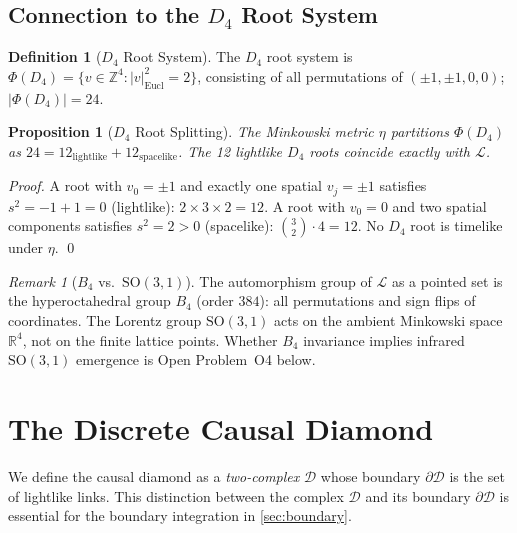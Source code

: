 \documentclass[12pt, a4paper]{article}
\theoremstyle{plain}
\newtheorem{proposition}[theorem]{Proposition}
\theoremstyle{definition}
\newtheorem{definition}[theorem]{Definition}
\theoremstyle{remark}
\newtheorem{remark}[theorem]{Remark}
\newcommand{\Lat}{\mathscr{L}}
\newcommand{\CD}{\mathscr{D}}
\newcommand{\BdyCD}{\partial\mathscr{D}}
\newcommand{\LL}{\mathcal{L}}
\newcommand{\ssp}{s^2}
\newcommand{\R}{\mathbb{R}}
\newcommand{\Z}{\mathbb{Z}}
\begin{document}
\subsection{Connection to the \texorpdfstring{$D_4$}{D4} Root System}

\begin{definition}[$D_4$ Root System]\label{def:d4}
The $D_4$ root system is
$\Phi(D_4) = \{v\in\Z^4 : |v|^2_\mathrm{Eucl}=2\}$,
consisting of all permutations of $(\pm1,\pm1,0,0)$;
$|\Phi(D_4)| = 24$.
\end{definition}

\begin{proposition}[$D_4$ Root Splitting]\label{prop:d4}
The Minkowski metric $\eta$ partitions $\Phi(D_4)$ as
$24 = 12_\mathrm{lightlike} + 12_\mathrm{spacelike}$.
The 12 lightlike $D_4$ roots coincide exactly with $\LL$.
\end{proposition}

\begin{proof}
A root with $v_0=\pm1$ and exactly one spatial $v_j=\pm1$
satisfies $\ssp=-1+1=0$ (lightlike): $2\times3\times2=12$.
A root with $v_0=0$ and two spatial components satisfies
$\ssp=2>0$ (spacelike): $\binom{3}{2}\cdot4=12$.
No $D_4$ root is timelike under $\eta$.
\qed
\end{proof}

\begin{remark}[$B_4$ vs.\ $\mathrm{SO}(3,1)$]\label{rem:b4symmetry}
The automorphism group of $\Lat$ as a pointed set is the
hyperoctahedral group $B_4$ (order $384$): all permutations
and sign flips of coordinates.
The Lorentz group $\mathrm{SO}(3,1)$ acts on the ambient
Minkowski space $\R^4$, not on the finite lattice points.
Whether $B_4$ invariance implies infrared $\mathrm{SO}(3,1)$
emergence is Open Problem~O4 below.
\end{remark}

\section{The Discrete Causal Diamond}\label{sec:diamond}

We define the causal diamond as a \emph{two-complex}
$\CD$ whose boundary $\BdyCD$ is the set of lightlike links.
This distinction between the complex $\CD$ and its boundary
$\BdyCD$ is essential for the boundary integration in \cref{sec:boundary}.
\end{document}
